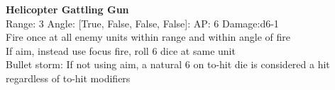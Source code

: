 {\bf Helicopter Gattling Gun } \\



Range: 3  Angle: [True, False, False, False]: AP: 6 Damage:d6-1 \\
Fire once at all enemy units within range and within angle of fire\\ 
If aim, instead use focus fire, roll 6 dice at same unit\\ 
Bullet storm: If not using aim, a natural 6 on to-hit die is considered a hit regardless of to-hit modifiers\\ 




 
\ \\



